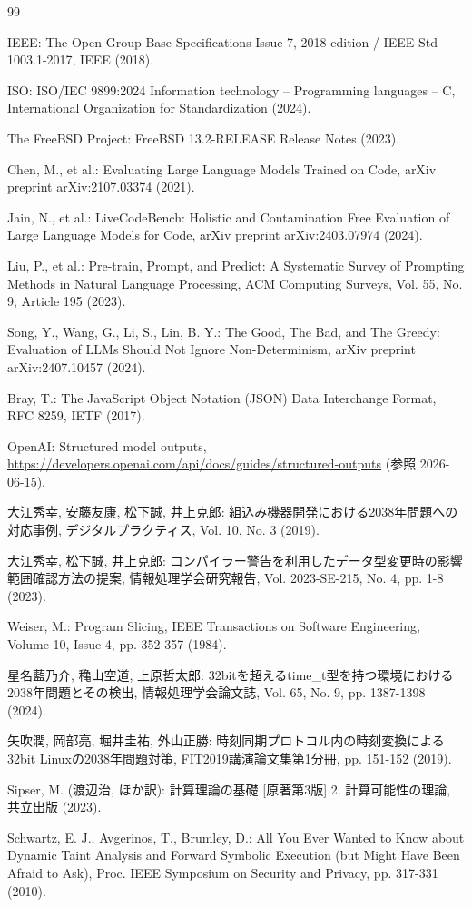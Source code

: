 \documentclass[submit,techrep,noauthor]{ipsj-lualatex}
\begin{document}
\begin{thebibliography}{99}

IEEE: The Open Group Base Specifications Issue 7, 2018 edition / IEEE Std 1003.1-2017, IEEE (2018).

ISO: ISO/IEC 9899:2024 Information technology -- Programming languages -- C, International Organization for Standardization (2024).

The FreeBSD Project: FreeBSD 13.2-RELEASE Release Notes (2023).

Chen, M., et al.: Evaluating Large Language Models Trained on Code, arXiv preprint arXiv:2107.03374 (2021).

Jain, N., et al.: LiveCodeBench: Holistic and Contamination Free Evaluation of Large Language Models for Code, arXiv preprint arXiv:2403.07974 (2024).

Liu, P., et al.: Pre-train, Prompt, and Predict: A Systematic Survey of Prompting Methods in Natural Language Processing, ACM Computing Surveys, Vol. 55, No. 9, Article 195 (2023).

Song, Y., Wang, G., Li, S., Lin, B. Y.: The Good, The Bad, and The Greedy: Evaluation of LLMs Should Not Ignore Non-Determinism, arXiv preprint arXiv:2407.10457 (2024).

Bray, T.: The JavaScript Object Notation (JSON) Data Interchange Format, RFC 8259, IETF (2017).

OpenAI: Structured model outputs, \url{https://developers.openai.com/api/docs/guides/structured-outputs} (参照 2026-06-15).

大江秀幸, 安藤友康, 松下誠, 井上克郎: 組込み機器開発における2038年問題への対応事例, デジタルプラクティス, Vol. 10, No. 3 (2019).

大江秀幸, 松下誠, 井上克郎: コンパイラー警告を利用したデータ型変更時の影響範囲確認方法の提案, 情報処理学会研究報告, Vol. 2023-SE-215, No. 4, pp. 1-8 (2023).

Weiser, M.: Program Slicing, IEEE Transactions on Software Engineering, Volume 10, Issue 4, pp. 352-357 (1984).

星名藍乃介, 穐山空道, 上原哲太郎: 32bitを超えるtime\_t型を持つ環境における2038年問題とその検出, 情報処理学会論文誌, Vol. 65, No. 9, pp. 1387-1398 (2024).

矢吹潤, 岡部亮, 堀井圭祐, 外山正勝: 時刻同期プロトコル内の時刻変換による32bit Linuxの2038年問題対策, FIT2019講演論文集第1分冊, pp. 151-152 (2019).

Sipser, M. (渡辺治, ほか訳): 計算理論の基礎 [原著第3版] 2. 計算可能性の理論, 共立出版 (2023).

Schwartz, E. J., Avgerinos, T., Brumley, D.: All You Ever Wanted to Know about Dynamic Taint Analysis and Forward Symbolic Execution (but Might Have Been Afraid to Ask), Proc. IEEE Symposium on Security and Privacy, pp. 317-331 (2010).

\end{thebibliography}
\end{document}
